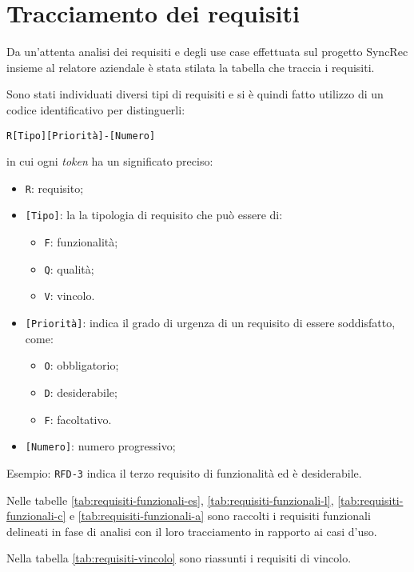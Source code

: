\section{Tracciamento dei requisiti}\label{tracciamento-requisiti}

Da un'attenta analisi dei requisiti e degli use case effettuata sul progetto SyncRec insieme al relatore aziendale è stata stilata la tabella che traccia i requisiti.

Sono stati individuati diversi tipi di requisiti e si è quindi fatto utilizzo di un codice identificativo per distinguerli:

\begin{center}
	\texttt{R[Tipo][Priorità]-[Numero]}
\end{center}
in cui ogni \textit{token} ha un significato preciso:
\begin{itemize}
	\item \texttt{R}: requisito;
	\item \texttt{[Tipo]}: la la tipologia di requisito che può essere di:
	\begin{itemize}
		\item \texttt{F}: funzionalità;
		\item \texttt{Q}: qualità;
		\item \texttt{V}: vincolo.
	\end{itemize}
	\item \texttt{[Priorità]}: indica il grado di urgenza di un requisito di essere soddisfatto, come:
	\begin{itemize}
		\item \texttt{O}: obbligatorio;
		\item \texttt{D}: desiderabile;
		\item \texttt{F}: facoltativo.
	\end{itemize}
	\item \texttt{[Numero]}: numero progressivo;
\end{itemize}

Esempio: \texttt{RFD-3} indica il terzo requisito di funzionalità ed è desiderabile.

Nelle tabelle \ref{tab:requisiti-funzionali-es}, \ref{tab:requisiti-funzionali-l}, \ref{tab:requisiti-funzionali-c} e \ref{tab:requisiti-funzionali-a} sono raccolti i requisiti funzionali delineati in fase di analisi con il loro tracciamento in rapporto ai casi d'uso.

Nella tabella \ref{tab:requisiti-vincolo} sono riassunti i requisiti di vincolo.

